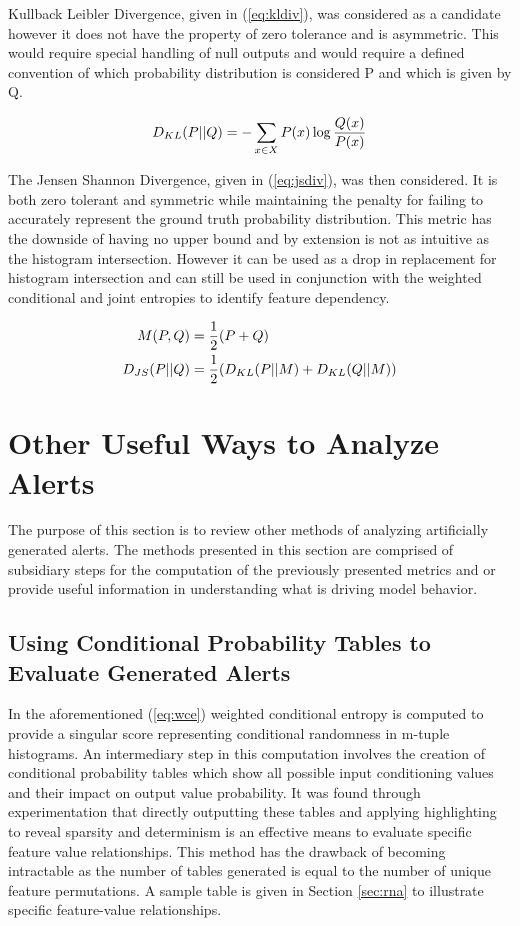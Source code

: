 Kullback Leibler Divergence, given in (\ref{eq:kldiv}), was considered as a candidate however it does not have the property of zero tolerance and is asymmetric. This would require special handling of null outputs and would require a defined convention of which probability distribution is considered P and which is given by Q.  

\begin{equation}
	\label{eq:kldiv}
	D_{KL}(P||Q) = -\sum_{x \in X}P(x)\log{Q(x) \over P(x)}
\end{equation}

The Jensen Shannon Divergence, given in (\ref{eq:jsdiv}), was then considered. It is both zero tolerant and symmetric while maintaining the penalty for failing to accurately represent the ground truth probability distribution. This metric has the downside of having no upper bound and by extension is not as intuitive as the histogram intersection. However it can be used as a drop in replacement for histogram intersection and can still be used in conjunction with the weighted conditional and joint entropies to identify feature dependency.

\begin{align}
	M(P,Q) &=  {1 \over 2}(P + Q)\label{eq:mid} \\
	D_{JS}(P||Q) &=  {1 \over 2}(D_{KL}(P||M) + D_{KL}(Q||M)) \label{eq:jsdiv}
\end{align}

\section{Other Useful Ways to Analyze Alerts}

The purpose of this section is to review other methods of analyzing artificially generated alerts. The methods presented in this section are comprised of subsidiary steps for the computation of the previously presented metrics and or provide useful information in understanding what is driving model behavior. 

\subsection{Using Conditional Probability Tables to Evaluate Generated Alerts}

In the aforementioned (\ref{eq:wce}) weighted conditional entropy is computed to provide a singular score representing conditional randomness in m-tuple histograms. An intermediary step in this computation involves the creation of conditional probability tables which show all possible input conditioning values and their impact on output value probability. It was found through experimentation that directly outputting these tables and applying highlighting to reveal sparsity and determinism is an effective means to evaluate specific feature value relationships. This method has the drawback of becoming intractable as the number of tables generated is equal to the number of unique feature permutations. A sample table is given in Section \ref{sec:rna} to illustrate specific feature-value relationships.

